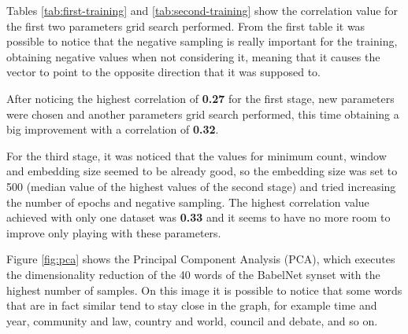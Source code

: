 \documentclass[11pt,oneside,a4paper]{article}
\begin{document}
Tables \ref{tab:first-training} and \ref{tab:second-training} show the correlation value for the first two parameters grid search performed. From the first table it was possible to notice that the negative sampling is really important for the training, obtaining negative values when not considering it, meaning that it causes the vector to point to the opposite direction that it was supposed to.

After noticing the highest correlation of \textbf{0.27} for the first stage, new parameters were chosen and another parameters grid search performed, this time obtaining a big improvement with a correlation of \textbf{0.32}.

For the third stage, it was noticed that the values for minimum count, window and embedding size seemed to be already good, so the embedding size was set to 500 (median value of the highest values of the second stage) and tried increasing the number of epochs and negative sampling. The highest correlation value achieved with only one dataset was \textbf{0.33} and it seems to have no more room to improve only playing with these parameters.

Figure \ref{fig:pca} shows the Principal Component Analysis (PCA), which executes the dimensionality reduction of the 40 words of the BabelNet synset with the highest number of samples. On this image it is possible to notice that some words that are in fact similar tend to stay close in the graph, for example time and year, community and law, country and world, council and debate, and so on.
\end{document}
